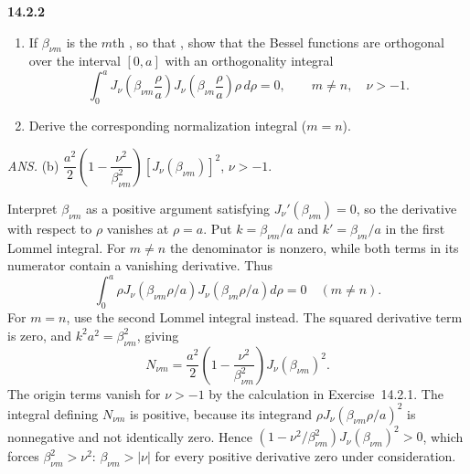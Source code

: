 \par\bigskip
\noindent\textbf{14.2.2}
\begin{enumerate}
\item[(a)] If $\beta_{\nu m}$ is the $m$th , so that
, show that the Bessel functions
are orthogonal over the interval $[0,a]$ with an orthogonality
integral
\[
\int_{0}^{a}J_{\nu}\left(\beta_{\nu m}\frac{\rho}{a}\right)
J_{\nu}\left(\beta_{\nu n}\frac{\rho}{a}\right)\rho\,d\rho=0,
\qquad m\neq n,\quad\nu>-1.
\]
\item[(b)] Derive the corresponding normalization integral ($m=n$).
\end{enumerate}
\par\nobreak\hfill\emph{ANS.}\enspace
(b) $\dfrac{a^{2}}{2}\left(1-\dfrac{\nu^{2}}{\beta_{\nu m}^{2}}\right)
[J_{\nu}(\beta_{\nu m})]^{2}$, $\nu>-1$.
\par{}
\solution
Interpret $\beta_{\nu m}$ as a positive argument satisfying
$J_\nu'(\beta_{\nu m})=0$, so the derivative with respect to $\rho$
vanishes at $\rho=a$. Put $k=\beta_{\nu m}/a$ and
$k'=\beta_{\nu n}/a$ in the first Lommel integral. For $m\ne n$
the denominator is nonzero, while both terms in its numerator
contain a vanishing derivative. Thus
\[
\boxed{\int_0^a \rho J_\nu(\beta_{\nu m}\rho/a)
J_\nu(\beta_{\nu n}\rho/a)d\rho=0\quad(m\ne n)}.
\]
For $m=n$, use the second Lommel integral instead. The squared
derivative term is zero, and $k^2a^2=\beta_{\nu m}^2$, giving
\[
\boxed{N_{\nu m}=\frac{a^2}{2}
\left(1-\frac{\nu^2}{\beta_{\nu m}^2}\right)
J_\nu(\beta_{\nu m})^2}.
\]
The origin terms vanish for $\nu>-1$ by the calculation in
Exercise~14.2.1. The integral defining $N_{\nu m}$ is positive,
because its integrand $\rho J_\nu(\beta_{\nu m}\rho/a)^2$ is
nonnegative and not identically zero. Hence
$(1-\nu^2/\beta_{\nu m}^2)J_\nu(\beta_{\nu m})^2>0$, which forces
$\beta_{\nu m}^2>\nu^2$: $\beta_{\nu m}>|\nu|$ for every positive
derivative zero under consideration.


